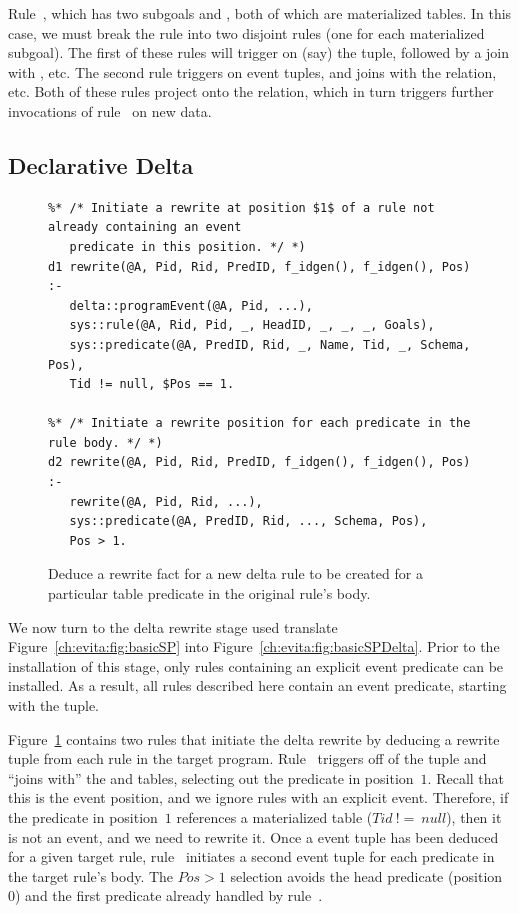 Rule~, which has two subgoals  and , both of which are
materialized tables.  In this case, we must break the rule into two disjoint
rules (one for each materialized subgoal).  The first of these rules will
trigger on (say) the  tuple, followed by a join with , etc.
The second rule triggers on  event tuples, and joins with the
 relation, etc.  Both of these rules project onto the 
relation, which in turn triggers further invocations of rule~ on new
 data.

\subsection{Declarative Delta}

\begin{figure}[!t]
\ssp
\centering
\begin{lstlisting}
%* /* Initiate a rewrite at position $1$ of a rule not already containing an event
   predicate in this position. */ *)
d1 rewrite(@A, Pid, Rid, PredID, f_idgen(), f_idgen(), Pos) :-
   delta::programEvent(@A, Pid, ...), 
   sys::rule(@A, Rid, Pid, _, HeadID, _, _, _, Goals),
   sys::predicate(@A, PredID, Rid, _, Name, Tid, _, Schema, Pos),
   Tid != null, $Pos == 1.

%* /* Initiate a rewrite position for each predicate in the rule body. */ *)
d2 rewrite(@A, Pid, Rid, PredID, f_idgen(), f_idgen(), Pos) :-
   rewrite(@A, Pid, Rid, ...),
   sys::predicate(@A, PredID, Rid, ..., Schema, Pos),
   Pos > 1.
\end{lstlisting}
\caption{\label{ch:evita:fig:delta1}Deduce a rewrite fact for a new delta rule to be
created for a particular table predicate in the original rule's body.}
\end{figure}

We now turn to the delta rewrite \OVERLOG stage used translate
Figure~\ref{ch:evita:fig:basicSP} into Figure~\ref{ch:evita:fig:basicSPDelta}.
Prior to the installation of this stage, only rules containing an explicit
event predicate can be installed.  As a result, all rules described here
contain an event predicate, starting with the  tuple.

Figure~\ref{ch:evita:fig:delta1} contains two rules that initiate the delta
rewrite by deducing a rewrite tuple from each rule in the target program.
Rule~ triggers off of the  tuple and ``joins
with'' the  and  tables, selecting out the predicate in
position~$1$.  Recall that this is the event position, and we ignore rules with
an explicit event.  Therefore, if the predicate in position~$1$ references a
materialized table ($Tid\ !=\ null$), then it is not an event, and we need to
rewrite it.  Once a  event tuple has been deduced for a given
target rule, rule~ initiates a second  event tuple for each
predicate in the target rule's body.  The $Pos > 1$ selection avoids the head
predicate (position $0$) and the first predicate already handled by
rule~.

